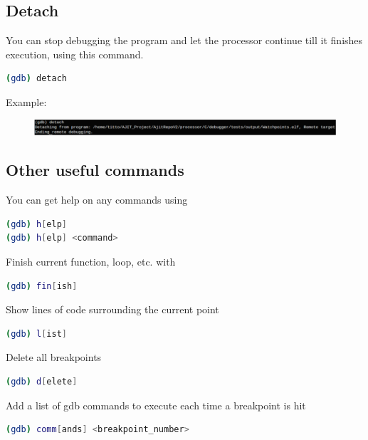 \documentclass[a4paper, 11pt]{article}
\begin{document}
\subsection*{Detach}
You can stop debugging the program and let the processor continue till it finishes execution, using this command.
\begin{lstlisting}[language=bash]
(gdb) detach
\end{lstlisting}

Example:
\begin{figure}[H]
	\centering
	\includegraphics[width=0.8\columnwidth]{Figs/twelve.png}
\end{figure}
\subsection{Other useful commands}
You can get help on any commands using
\begin{lstlisting}[language=bash]
(gdb) h[elp]
(gdb) h[elp] <command>
\end{lstlisting}
Finish current function, loop, etc. with
\begin{lstlisting}[language=bash]
(gdb) fin[ish]
\end{lstlisting}
Show lines of code surrounding the current point
\begin{lstlisting}[language=bash]
(gdb) l[ist]
\end{lstlisting}
Delete all breakpoints
\begin{lstlisting}[language=bash]
(gdb) d[elete]
\end{lstlisting}
Add a list of gdb commands to execute each time a breakpoint is hit
\begin{lstlisting}[language=bash]
(gdb) comm[ands] <breakpoint_number>
\end{lstlisting}
\end{document}
